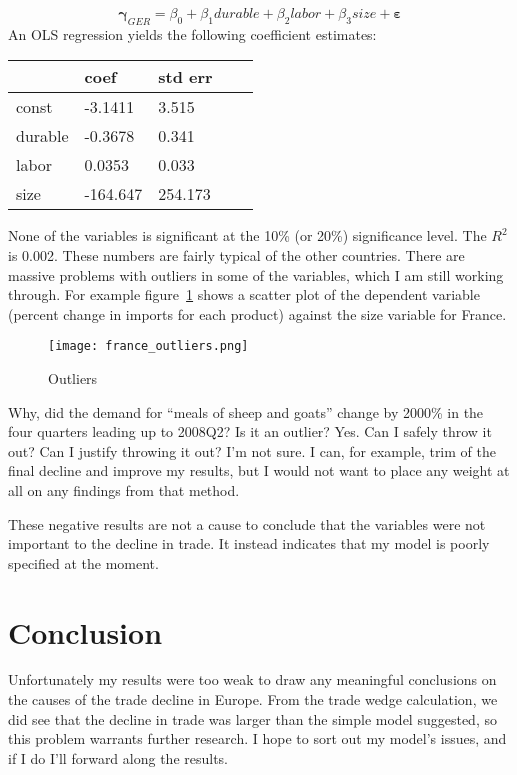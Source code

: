 \documentclass[11pt]{article}
\begin{document}
  \begin{equation} \label{eq:ex_reg}
    \mathbf{\gamma}_{GER} = \beta_0 + \beta_1 durable + \beta_2 labor + \beta_3 size + \mathbf{\varepsilon}
  \end{equation}
   An OLS regression yields the following coefficient estimates:

  \begin{center} \label{tab:ex_coef}
    \begin{tabular}{|l|l|l|l|l|}
    \hline
            & coef     & std err \\ \hline
    const   & -3.1411  & 3.515   \\
    durable & -0.3678  & 0.341   \\
    labor   & 0.0353   & 0.033   \\
    size    & -164.647 & 254.173 \\ \hline

    \end{tabular}
  \end{center}    
  
  None of the variables is significant at the 10\% (or 20\%) significance level. The $R^2$ is 0.002.  These numbers are fairly typical of the other countries.  There are massive problems with outliers in some of the variables, which I am still working through.  For example figure~\ref{fig:outliers} shows a scatter plot of the dependent variable (percent change in imports for each product) against the size variable for France. 

  \begin{figure}[ht]
    \centering
      \texttt{[image: france\_outliers.png]}
    \caption{Outliers}
    \label{fig:outliers}
  \end{figure}

  Why, did the demand for ``meals of sheep and goats'' change by 2000\% in the four quarters leading up to 2008Q2?  Is it an outlier? Yes.  Can I safely throw it out?  Can I justify throwing it out? I'm not sure.  I can, for example, trim of the final decline and improve my results, but I would not want to place any weight at all on any findings from that method.
  
  These negative results are not a cause to conclude that the variables were not important to the decline in trade. It instead indicates that my model is poorly specified at the moment.

\section{Conclusion}
\label{sec:conclusion}
  Unfortunately my results were too weak to draw any meaningful conclusions on the causes of the trade decline in Europe.  From the trade wedge calculation, we did see that the decline in trade was larger than the simple model suggested, so this problem warrants further research.  I hope to sort out my model's issues, and if I do I'll forward along the results.
\end{document}

